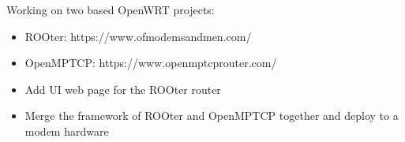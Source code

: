 \documentclass[11pt,oneside,a4paper]{article}
\begin{document}
\begin{tcolorbox}
\begin{minipage}[t]{11cm}
\begin{tcolorbox}[grow to right by=0.75cm,colback=white,colframe=white]
\begin{itemize}
{                    Working on two based OpenWRT projects:
                    \begin{itemize}[label=$\circ$]
                        \item {ROOter: https://www.ofmodemsandmen.com/}
                        \item {OpenMPTCP: https://www.openmptcprouter.com/}
                        \item {Add UI web page for the ROOter router}
                        \item {Merge the framework of ROOter and OpenMPTCP together and deploy to a modem hardware}
                    \end{itemize}
                }
            \end{itemize}
        \end{tcolorbox}
    \end{minipage}

\end{tcolorbox}
\end{document}
